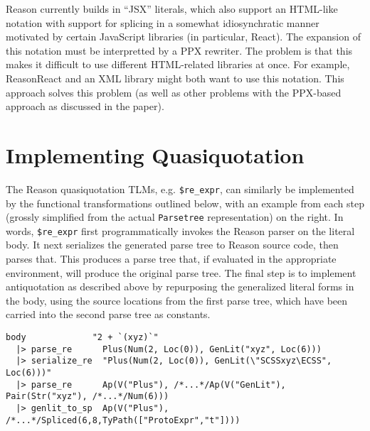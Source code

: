 \documentclass[12pt]{report}
\newcommand{\li}[1]{\lstinline[basicstyle=\ttfamily\fontsize{10pt}{1em}\selectfont]{#1}}
\begin{document}
Reason currently builds in ``JSX'' literals, which also support an HTML-like notation with support for splicing in a somewhat idiosynchratic manner motivated by certain JavaScript libraries (in particular, React). The expansion of this notation must be interpretted by a PPX rewriter. The problem is that this makes it difficult to use different HTML-related libraries at once. For example, ReasonReact and an XML library might both want to use this notation. This approach solves this problem (as well as other problems with the PPX-based approach as discussed in the paper). %



\section{Implementing Quasiquotation} The Reason quasiquotation TLMs, e.g. \li{$re_expr}, can similarly be implemented by the functional transformations outlined below, with an example from each step (grossly simplified from the actual \li{Parsetree} representation) on the right. In words, \li{$re_expr} first programmatically invokes the Reason parser on the literal body. It next serializes the generated parse tree to Reason source code, then parses that. This produces a parse tree that, if evaluated in the appropriate environment, will produce the original parse tree. The final step is to implement antiquotation as described above by repurposing the generalized literal forms in the body, using the source locations from the first parse tree, which have  been carried into the second parse tree as constants.
\begin{lstlisting}[numbers=none,basicstyle=\ttfamily\fontsize{8pt}{1em}\selectfont]
  body             "2 + `(xyz)`" 
  |> parse_re      Plus(Num(2, Loc(0)), GenLit("xyz", Loc(6)))
  |> serialize_re  "Plus(Num(2, Loc(0)), GenLit(\"SCSSxyz\ECSS", Loc(6)))"
  |> parse_re      Ap(V("Plus"), /*...*/Ap(V("GenLit"), Pair(Str("xyz"), /*...*/Num(6)))
  |> genlit_to_sp  Ap(V("Plus"), /*...*/Spliced(6,8,TyPath(["ProtoExpr","t"])))
\end{lstlisting}

\end{document}
